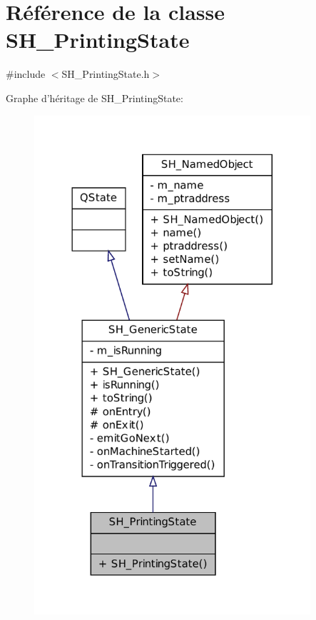 \hypertarget{classSH__PrintingState}{\section{Référence de la classe S\-H\-\_\-\-Printing\-State}
\label{classSH__PrintingState}
}


{\ttfamily \#include $<$S\-H\-\_\-\-Printing\-State.\-h$>$}



Graphe d'héritage de S\-H\-\_\-\-Printing\-State\-:
\nopagebreak
\begin{figure}[H]
\begin{center}
\leavevmode
\includegraphics[width=290pt]{classSH__PrintingState__inherit__graph}
\end{center}
\end{figure}


